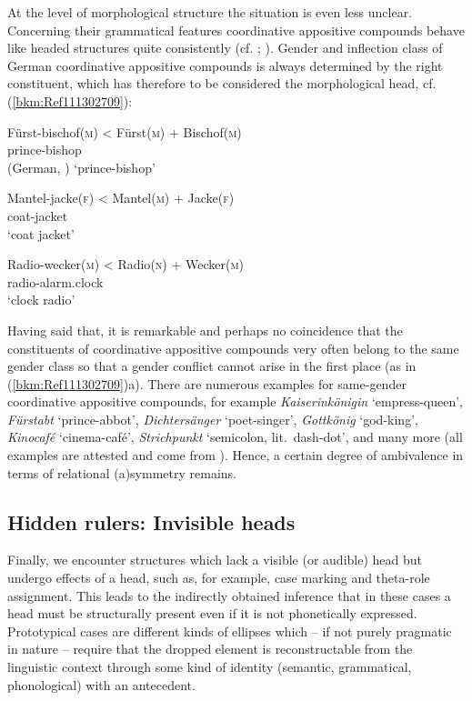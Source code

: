 \documentclass[output=paper
  ,nobabel
  ,draftmode
  ,colorlinks, citecolor=brown
]{langscibook}
\begin{document}
At the level of morphological structure the situation is even less unclear. Concerning their
grammatical features coordinative appositive compounds behave like headed structures quite
consistently (cf. \citealt[143]{Olsen1990b}; \citealt[369]{Olsen2015b}). Gender and inflection class
of German coordinative appositive compounds is always determined by the right constituent, which has
therefore to be considered the morphological head, cf. (\ref{bkm:Ref111302709}):

\eal

\label{bkm:Ref111302709}
\ex 
\gll Fürst-bischof\textsc{(m)}  <  Fürst\textsc{(m)} + Bischof\textsc{(m)}\\
       prince-bishop\\\hfill(German, \citealt[34]{BreindlThurmair1992})
\glt   `prince-bishop'

\ex
\gll Mantel-jacke\textsc{(f)}  <  Mantel\textsc{(m)} + Jacke\textsc{(f)}\\
       coat-jacket \\
\glt   `coat jacket'

\ex
\gll Radio-wecker\textsc{(m)}  <  Radio\textsc{(n)} + Wecker\textsc{(m)}\\
       radio-alarm.clock \\
\glt   `clock radio'
\zl

\noindent
Having said that, it is remarkable and perhaps no coincidence that the constituents of coordinative
appositive compounds very often belong to the same gender class so that a gender conflict cannot
arise in the first place (as in (\ref{bkm:Ref111302709})a). There are numerous examples for
same-gender coordinative appositive compounds, for example \emph{Kaiserinkönigin} `empress-queen',
\emph{Fürstabt} `prince-abbot', \emph{Dichtersänger} `poet-singer', \emph{Gottkönig} `god-king',
\emph{Kinocafé} `cinema-café', \emph{Strichpunkt} `semicolon, lit.\ dash-dot', and many more (all
examples are attested and come from \citealt[34]{BreindlThurmair1992}). Hence, a certain degree of
ambivalence in terms of relational (a)symmetry remains.

\subsection{Hidden rulers: Invisible heads}

Finally, we encounter structures which lack a visible (or audible) head but undergo effects of a
head, such as, for example, case marking and theta-role assignment. This leads to the indirectly
obtained inference that in these cases a head must be structurally present even if it is not
phonetically expressed. Prototypical cases are different kinds of ellipses which – if not purely
pragmatic in nature – require that the dropped element is reconstructable from the linguistic
context through some kind of identity (semantic, grammatical, phonological) with an antecedent.
\end{document}
